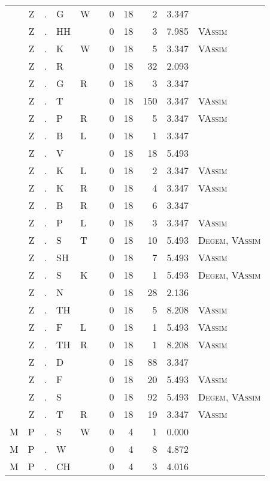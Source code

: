 \begin{longtable}{r@{ } r@{ } c@{ } l@{ } l@{ } l@{ } r r r r l }
 & Z & . & G & W &  & 0 & 18 & 2 & 3.347 &  \\
 & Z & . & HH &  &  & 0 & 18 & 3 & 7.985 & \textsc{VAssim} \\
 & Z & . & K & W &  & 0 & 18 & 5 & 3.347 & \textsc{VAssim} \\
 & Z & . & R &  &  & 0 & 18 & 32 & 2.093 &  \\
 & Z & . & G & R &  & 0 & 18 & 3 & 3.347 &  \\
 & Z & . & T &  &  & 0 & 18 & 150 & 3.347 & \textsc{VAssim} \\
 & Z & . & P & R &  & 0 & 18 & 5 & 3.347 & \textsc{VAssim} \\
 & Z & . & B & L &  & 0 & 18 & 1 & 3.347 &  \\
 & Z & . & V &  &  & 0 & 18 & 18 & 5.493 &  \\
 & Z & . & K & L &  & 0 & 18 & 2 & 3.347 & \textsc{VAssim} \\
 & Z & . & K & R &  & 0 & 18 & 4 & 3.347 & \textsc{VAssim} \\
 & Z & . & B & R &  & 0 & 18 & 6 & 3.347 &  \\
 & Z & . & P & L &  & 0 & 18 & 3 & 3.347 & \textsc{VAssim} \\
 & Z & . & S & T &  & 0 & 18 & 10 & 5.493 & \textsc{Degem}, \textsc{VAssim} \\
 & Z & . & SH &  &  & 0 & 18 & 7 & 5.493 & \textsc{VAssim} \\
 & Z & . & S & K &  & 0 & 18 & 1 & 5.493 & \textsc{Degem}, \textsc{VAssim} \\
 & Z & . & N &  &  & 0 & 18 & 28 & 2.136 &  \\
 & Z & . & TH &  &  & 0 & 18 & 5 & 8.208 & \textsc{VAssim} \\
 & Z & . & F & L &  & 0 & 18 & 1 & 5.493 & \textsc{VAssim} \\
 & Z & . & TH & R &  & 0 & 18 & 1 & 8.208 & \textsc{VAssim} \\
 & Z & . & D &  &  & 0 & 18 & 88 & 3.347 &  \\
 & Z & . & F &  &  & 0 & 18 & 20 & 5.493 & \textsc{VAssim} \\
 & Z & . & S &  &  & 0 & 18 & 92 & 5.493 & \textsc{Degem}, \textsc{VAssim} \\
 & Z & . & T & R &  & 0 & 18 & 19 & 3.347 & \textsc{VAssim} \\
M & P & . & S & W &  & 0 & 4 & 1 & 0.000 &  \\
M & P & . & W &  &  & 0 & 4 & 8 & 4.872 &  \\
M & P & . & CH &  &  & 0 & 4 & 3 & 4.016 &  \\

\end{longtable}

